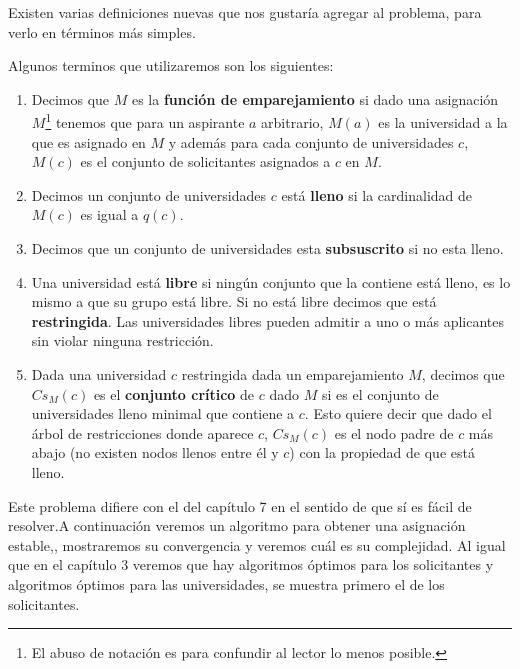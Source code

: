 Existen varias definiciones nuevas que nos gustaría agregar al problema, para verlo en términos más simples.
\begin{dfn}
Algunos terminos que utilizaremos son los siguientes:
\begin{enumerate}

\item Decimos que $M$ es la \textbf{función de emparejamiento} si dado una asignación $M$\footnote{El abuso de notación es para confundir al lector lo menos posible.} tenemos que para un aspirante $a$ arbitrario, $M(a)$ es la universidad a la que es asignado en $M$ y además para cada conjunto de universidades $c$, $M(c)$ es el conjunto de solicitantes asignados a $c$ en $M$.
\item Decimos un conjunto de universidades $c$ está \textbf{lleno} si la cardinalidad de $M(c)$ es igual a $q(c)$. 
\item Decimos que un conjunto de universidades esta \textbf{subsuscrito} si no esta lleno. 
\item Una universidad está \textbf{libre} si ningún conjunto que la contiene está lleno, es lo mismo a que su grupo está libre. Si no está libre decimos que está \textbf{restringida}. Las universidades libres pueden admitir a uno o más aplicantes sin violar ninguna restricción. 
\item Dada una universidad $c$ restringida dada un emparejamiento $M$, decimos que $Cs_M(c)$ es el \textbf{conjunto crítico} de $c$ dado $M$ si es el conjunto de universidades lleno minimal que contiene a $c$. Esto quiere decir que dado el árbol de restricciones donde aparece $c$, $Cs_M(c)$ es el nodo padre de $c$ más abajo (no existen nodos llenos entre él y $c$) con la propiedad de que está lleno. 
\end{enumerate}
\end{dfn}



Este problema difiere con el del capítulo 7 en el sentido de que sí es fácil de resolver.A continuación veremos un algoritmo para obtener una asignación estable,, mostraremos su convergencia y veremos cuál es su complejidad. Al igual que en el capítulo 3 veremos que hay algoritmos óptimos para los solicitantes y algoritmos óptimos para las universidades, se muestra primero el de los solicitantes. %

